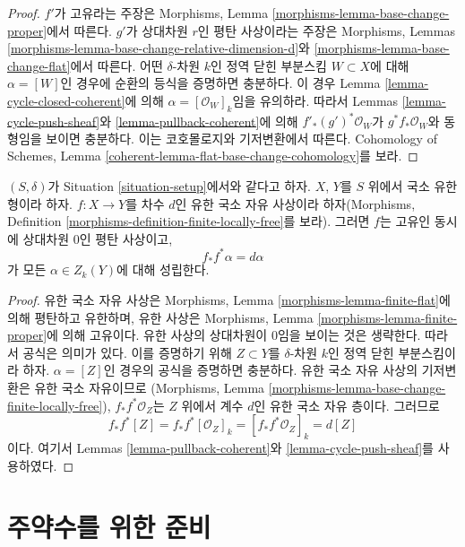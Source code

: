 \begin{proof}
$f'$가 고유라는 주장은 Morphisms, Lemma
\ref{morphisms-lemma-base-change-proper}에서 따른다. $g'$가 상대차원
$r$인 평탄 사상이라는 주장은 Morphisms, Lemmas
\ref{morphisms-lemma-base-change-relative-dimension-d}와
\ref{morphisms-lemma-base-change-flat}에서 따른다. 어떤
$\delta$-차원 $k$인 정역 닫힌 부분스킴 $W \subset X$에 대해
$\alpha = [W]$인 경우에 순환의 등식을 증명하면 충분하다. 이 경우
Lemma \ref{lemma-cycle-closed-coherent}에 의해
$\alpha = [\mathcal{O}_W]_k$임을 유의하라. 따라서 Lemmas
\ref{lemma-cycle-push-sheaf}와 \ref{lemma-pullback-coherent}에 의해
$f'_*(g')^*\mathcal{O}_W$가 $g^*f_*\mathcal{O}_W$와 동형임을 보이면
충분하다. 이는 코호몰로지와 기저변환에서 따른다. Cohomology of Schemes,
Lemma \ref{coherent-lemma-flat-base-change-cohomology}를 보라.
\end{proof}

\begin{lemma}
\label{lemma-finite-flat}
$(S, \delta)$가 Situation \ref{situation-setup}에서와 같다고 하자.
$X$, $Y$를 $S$ 위에서 국소 유한형이라 하자. $f : X \to Y$를 차수
$d$인 유한 국소 자유 사상이라 하자(Morphisms, Definition
\ref{morphisms-definition-finite-locally-free}를 보라). 그러면 $f$는
고유인 동시에 상대차원 $0$인 평탄 사상이고,
$$
f_*f^*\alpha = d\alpha
$$
가 모든 $\alpha \in Z_k(Y)$에 대해 성립한다.
\end{lemma}

\begin{proof}
유한 국소 자유 사상은 Morphisms, Lemma
\ref{morphisms-lemma-finite-flat}에 의해 평탄하고 유한하며, 유한 사상은
Morphisms, Lemma \ref{morphisms-lemma-finite-proper}에 의해 고유이다.
유한 사상의 상대차원이 $0$임을 보이는 것은 생략한다. 따라서 공식은
의미가 있다. 이를 증명하기 위해 $Z \subset Y$를 $\delta$-차원 $k$인
정역 닫힌 부분스킴이라 하자. $\alpha = [Z]$인 경우의 공식을 증명하면
충분하다. 유한 국소 자유 사상의 기저변환은 유한 국소 자유이므로
(Morphisms, Lemma \ref{morphisms-lemma-base-change-finite-locally-free}),
$f_*f^*\mathcal{O}_Z$는 $Z$ 위에서 계수 $d$인 유한 국소 자유 층이다.
그러므로
$$
f_*f^*[Z] = f_*f^*[\mathcal{O}_Z]_k =
[f_*f^*\mathcal{O}_Z]_k = d[Z]
$$
이다. 여기서 Lemmas \ref{lemma-pullback-coherent}와
\ref{lemma-cycle-push-sheaf}를 사용하였다.
\end{proof}








\section{주약수를 위한 준비}
\label{section-preparation-principal-divisors}

